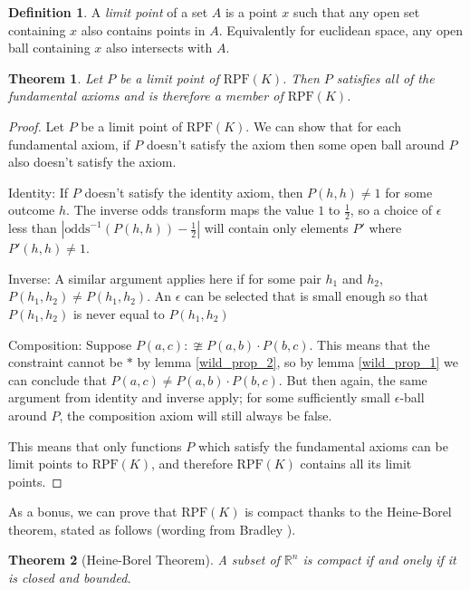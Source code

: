 \documentclass[twoside]{article}
\theoremstyle{plain}%
\newtheorem{theorem}{Theorem}[section]
\theoremstyle{definition}
\newtheorem{definition}{Definition}[section]
\theoremstyle{remark}
\begin{document}
\begin{definition}
A \textit{limit point} of a set \(A\) is a point \(x\) such that any open set containing \(x\) also contains points in \(A\). Equivalently for euclidean space, any open ball containing \(x\) also intersects with \(A\).
\end{definition}

\begin{theorem}
\label{thm:rpf_closed}
Let \(P\) be a \textit{limit point} of \(\text{RPF}(K)\). Then \(P\) satisfies all of the fundamental axioms and is therefore a member of \(\text{RPF}(K)\).
\end{theorem}

\begin{proof}
Let \(P\) be a limit point of \(\text{RPF}(K)\). We can show that for each fundamental axiom, if \(P\) doesn't satisfy the axiom then some open ball around \(P\) also doesn't satisfy the axiom.

Identity: If \(P\) doesn't satisfy the identity axiom, then \(P(h, h) \neq 1\) for some outcome \(h\). The inverse odds transform maps the value \(1\) to \(\frac{1}{2}\), so a choice of \(\epsilon\) less than \(|\text{odds}^{-1}(P(h, h)) - \frac{1}{2}|\) will contain only elements \(P'\) where \(P'(h, h) \neq 1\).

Inverse: A similar argument applies here if for some pair \(h_1\) and \(h_2\), \(P(h_1, h_2) \neq P(h_1, h_2)\). An \(\epsilon\) can be selected that is small enough so that \(P(h_1, h_2)\) is never equal to \(P(h_1, h_2)\)

Composition: Suppose \(P(a, c) :\ncong P(a, b) \cdot P(b, c) \). This means that the constraint cannot be \(\ast\) by lemma \ref{wild_prop_2}, so by lemma \ref{wild_prop_1} we can conclude that \(P(a, c) \neq P(a, b) \cdot P(b, c) \). But then again, the same argument from identity and inverse apply; for some sufficiently small \(\epsilon\)-ball around \(P\), the composition axiom will still always be false.

This means that only functions \(P\) which satisfy the fundamental axioms can be limit points to \(\text{RPF}(K)\), and therefore \(\text{RPF}(K)\) contains all its limit points.
\end{proof}

As a bonus, we can prove that \(\text{RPF}(K)\) is compact thanks to the Heine-Borel theorem, stated as follows (wording from Bradley \cite{bradley}).

\begin{theorem}[Heine-Borel Theorem]
A subset of \(\mathbb{R}^n\) is compact if and onely if it is closed and bounded.
\end{theorem}
\end{document}
